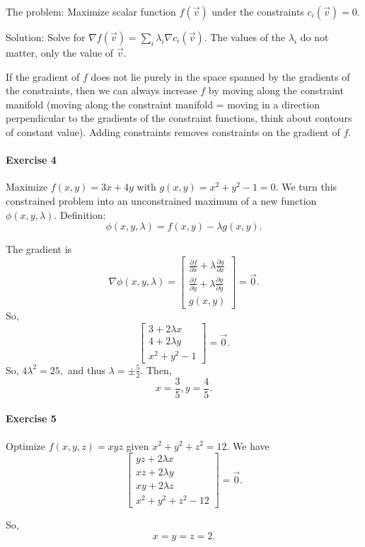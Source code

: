\documentclass[12pt]{article}
\begin{document}
The problem: Maximize scalar function $f(\vec{v})$ under the constraints $c_i(\vec{v}) = 0$.

Solution: Solve for $\nabla f(\vec{v}) = \sum_i \lambda_i \nabla c_i(\vec{v})$. The values of the $\lambda_i$ do not matter, only the value of $\vec{v}$.

If the gradient of $f$ does not lie purely in the space spanned by the gradients of the constraints, then we can always increase $f$ by moving along the constraint manifold (moving along the constraint manifold = moving in a direction perpendicular to the gradients of the constraint functions, think about contours of constant value). Adding constraints removes constraints on the gradient of $f$.


\paragraph{Exercise 4}
Maximize $f(x,y)=3x+4y$ with $g(x,y)=x^2+y^2-1=0.$
We turn this constrained problem into an unconstrained maximum of a new function $\phi(x,y,\lambda).$
Definition: \[\phi(x,y,\lambda)=f(x,y)-\lambda g(x,y).\]

The gradient is
\[\nabla\phi(x,y,\lambda)=\begin{bmatrix}
\frac{\partial f}{\partial x}+\lambda \frac{\partial g}{\partial x}\\
\frac{\partial f}{\partial y}+\lambda \frac{\partial g}{\partial y}\\
g(x,y)
\end{bmatrix}=\vec{0}.\]
So,
\[\begin{bmatrix}
    3+2\lambda x\\
    4+2\lambda y\\
    x^2+y^2-1
\end{bmatrix}=\vec{0}.\]
So, $4\lambda^2=25,$ and thus $\lambda=\pm \frac{5}{2}.$ Then,
\[x=\frac{3}{5},y=\frac{4}{5}.\]

\paragraph{Exercise 5}
Optimize $f(x,y,z)=xyz$ given $x^2+y^2+z^2=12.$
We have
\[\begin{bmatrix}
    yz+2\lambda x\\
    xz+2\lambda y\\
    xy+2\lambda z\\
    x^2+y^2+z^2-12
\end{bmatrix}=\vec{0}.\]

So, \[x=y=z=2.\] 
\end{document}
